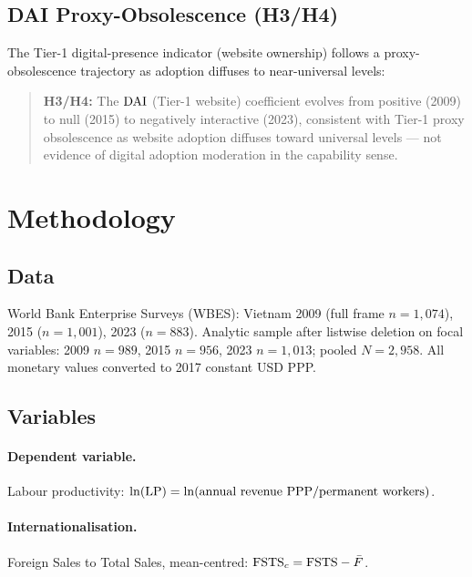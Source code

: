 \documentclass[12pt,a4paper]{article}
\begin{document}
\subsection{DAI Proxy-Obsolescence (H3/H4)}

The Tier-1 digital-presence indicator (website ownership) follows a
proxy-obsolescence trajectory as adoption diffuses to near-universal levels:

\begin{quote}
\textbf{H3/H4:} The \({\mathrm{DAI}}\) (Tier-1 website) coefficient evolves from
positive (2009) to null (2015) to negatively interactive (2023), consistent with
Tier-1 proxy obsolescence as website adoption diffuses toward universal levels ---
not evidence of digital adoption moderation in the capability sense.
\end{quote}

\section{Methodology}
\label{sec:methods}

\subsection{Data}

World Bank Enterprise Surveys (WBES): Vietnam 2009 (full frame \(n = 1{,}074\)),
2015 (\(n = 1{,}001\)), 2023 (\(n = 883\)).  Analytic sample after listwise deletion
on focal variables: 2009 \(n = 989\), 2015 \(n = 956\), 2023 \(n = 1{,}013\);
pooled \(N = 2{,}958\).  All monetary values converted to 2017 constant USD PPP.

\subsection{Variables}

\paragraph{Dependent variable.}
Labour productivity: \({\ln(\mathrm{LP})} = \ln(\text{annual revenue PPP} / \text{permanent
workers})\).

\paragraph{Internationalisation.}
Foreign Sales to Total Sales, mean-centred: \({\mathrm{FSTS}_{c}} = {\mathrm{FSTS}} - \bar{F}\).
\end{document}
